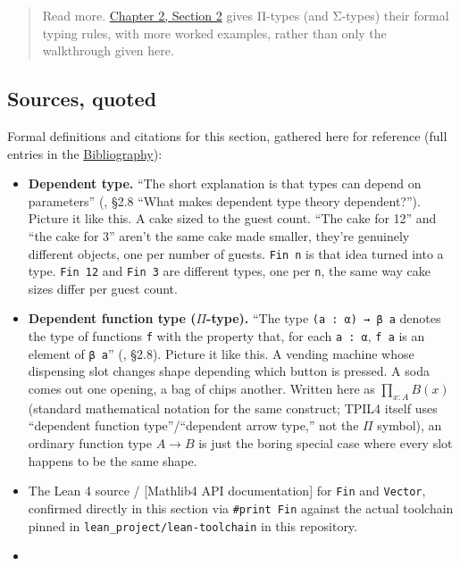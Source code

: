 \begin{quote}
Read more. \hyperref[sec:02-terminology-and-coc:02-pi-sigma-and-coc:1]{Chapter 2, Section 2} gives Π-types (and Σ-types) their formal typing rules, with more worked examples, rather than only the walkthrough given here.
\end{quote}

\subsection{Sources, quoted}\label{sec:01-basics:03-dependent-types:9}

Formal definitions and citations for this section, gathered here for reference (full entries in the \hyperref[sec:root:bibliography:1]{Bibliography}):

\begin{itemize}
\tightlist
\item
  \textbf{Dependent type.} ``The short explanation is that types can depend on parameters'' (\cite{TPIL4}, §2.8 ``What makes dependent type theory dependent?''). Picture it like this. A cake sized to the guest count. ``The cake for 12'' and ``the cake for 3'' aren't the same cake made smaller, they're genuinely different objects, one per number of guests. \texttt{Fin n} is that idea turned into a type. \texttt{Fin 12} and \texttt{Fin 3} are different types, one per \texttt{n}, the same way cake sizes differ per guest count.
\item
  \textbf{Dependent function type (\(\Pi\)-type).} ``The type \texttt{(a : α) → β a} denotes the type of functions \texttt{f} with the property that, for each \texttt{a : α}, \texttt{f a} is an element of \texttt{β a}'' (\cite{TPIL4}, §2.8). Picture it like this. A vending machine whose dispensing slot changes shape depending which button is pressed. A soda comes out one opening, a bag of chips another. Written here as \(\prod_{x:A} B(x)\) (standard mathematical notation for the same construct; TPIL4 itself uses ``dependent function type''/``dependent arrow type,'' not the \(\Pi\) symbol), an ordinary function type \(A \to B\) is just the boring special case where every slot happens to be the same shape.
\item
  The Lean 4 source / {[}Mathlib4 API documentation{]}\cite{Mathlib4Docs} for \texttt{Fin} and \texttt{Vector}, confirmed directly in this section via \texttt{\#print Fin} against the actual toolchain pinned in \texttt{lean\_\allowbreak{}project/\allowbreak{}lean-\allowbreak{}toolchain} in this repository.
\item

\end{itemize}
